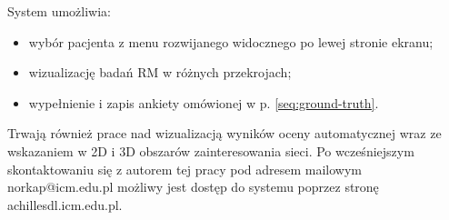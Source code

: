 System umożliwia:
\begin{itemize}[noitemsep,nolistsep]
	\item wybór pacjenta z menu rozwijanego widocznego po lewej stronie ekranu;
	\item wizualizację badań RM w różnych przekrojach;
	\item wypełnienie i zapis ankiety omówionej w p. \ref{seq:ground-truth}.
\end{itemize}

Trwają również prace nad wizualizacją wyników oceny automatycznej wraz ze wskazaniem w 2D i 3D obszarów zainteresowania sieci. Po wcześniejszym skontaktowaniu się z autorem tej pracy pod adresem mailowym norkap@icm.edu.pl możliwy jest dostęp do systemu poprzez stronę achillesdl.icm.edu.pl.